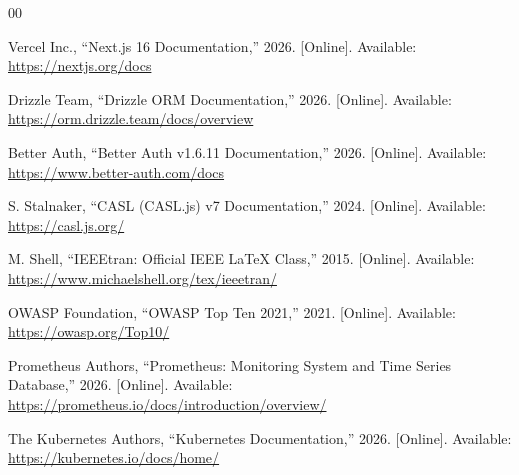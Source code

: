 \documentclass[conference]{IEEEtran}
\begin{document}
\begin{thebibliography}{00}

Vercel Inc., ``Next.js 16 Documentation,'' 2026. [Online]. Available: \url{https://nextjs.org/docs}

Drizzle Team, ``Drizzle ORM Documentation,'' 2026. [Online]. Available: \url{https://orm.drizzle.team/docs/overview}

Better Auth, ``Better Auth v1.6.11 Documentation,'' 2026. [Online]. Available: \url{https://www.better-auth.com/docs}

S. Stalnaker, ``CASL (CASL.js) v7 Documentation,'' 2024. [Online]. Available: \url{https://casl.js.org/}

M. Shell, ``IEEEtran: Official IEEE LaTeX Class,'' 2015. [Online]. Available: \url{https://www.michaelshell.org/tex/ieeetran/}

OWASP Foundation, ``OWASP Top Ten 2021,'' 2021. [Online]. Available: \url{https://owasp.org/Top10/}

Prometheus Authors, ``Prometheus: Monitoring System and Time Series Database,'' 2026. [Online]. Available: \url{https://prometheus.io/docs/introduction/overview/}

The Kubernetes Authors, ``Kubernetes Documentation,'' 2026. [Online]. Available: \url{https://kubernetes.io/docs/home/}

\end{thebibliography}
\end{document}
